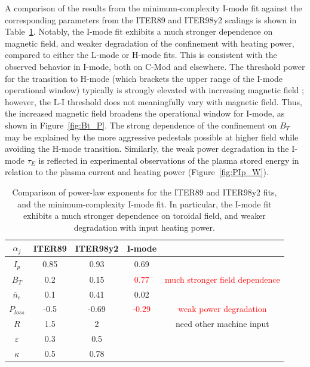 \documentclass[12pt]{iopart}
\begin{document}
A comparison of the results from the minimum-complexity I-mode fit against the corresponding parameters from the ITER89 and ITER98y2 scalings is shown in Table~\ref{tab:compare}.  
Notably, the I-mode fit exhibits a much stronger dependence on magnetic field, and weaker degradation of the confinement with heating power, compared to either the L-mode or H-mode fits.
This is consistent with the observed behavior in I-mode, both on C-Mod and elsewhere.
The threshold power for the transition to H-mode (which brackets the upper range of the I-mode operational window) typically is strongly elevated with increasing magnetic field \cite{Martin2008}; however, the L-I threshold does not meaningfully vary with magnetic field.
Thus, the increased magnetic field broadens the operational window for I-mode, as shown in Figure~\ref{fig:Bt_P}.
The strong dependence of the confinement on $B_T$ may be explained by the more aggressive pedestals possible at higher field while avoiding the H-mode transition.
Similarly, the weak power degradation in the I-mode $\tau_E$ is reflected in experimental observations of the plasma stored energy in relation to the plasma current and heating power (Figure~\ref{fig:PIp_W}).

\begin{table}[ht]
 \centering
 \begin{tabular}{ccccc}
  \hline
  $\alpha_j$ & ITER89 & ITER98y2 & I-mode & \\
  \hline
  $I_p$ & 0.85 & 0.93 & 0.69 & \\
  $B_T$ & 0.2 & 0.15 & \textcolor{red}{0.77} & \small{\textcolor{red}{much stronger field dependence}}\\
  $\overline{n}_e$ & 0.1 & 0.41 & 0.02 & \\
  $P_{loss}$ & -0.5 & -0.69 & \textcolor{red}{-0.29} & \small{\textcolor{red}{weak power degradation}} \\
  $R$ & 1.5 & 2 &  & \small{need other machine input} \\
  $\varepsilon$ & 0.3 & 0.5 &  & \\
  $\kappa$ & 0.5 & 0.78 &  & \\
  \hline
 \end{tabular}
 \caption{Comparison of power-law exponents for the ITER89 and ITER98y2 fits, and the minimum-complexity I-mode fit.  In particular, the I-mode fit exhibits a much stronger dependence on toroidal field, and weaker degradation with input heating power.}
 \label{tab:compare}
\end{table}
\end{document}
